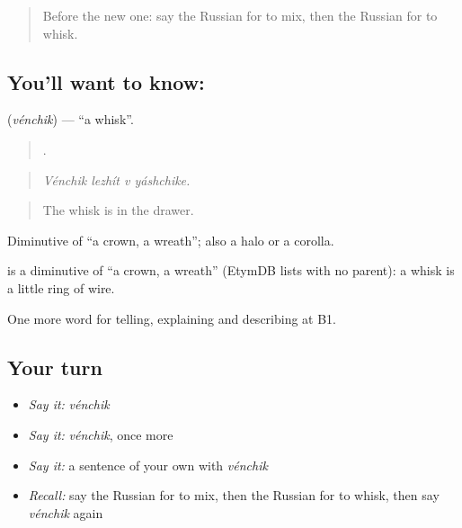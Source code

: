 \label{lesson:RU-C330-venchik}



\begin{quote}
Before the new one: say the Russian for to mix, then the Russian for to whisk.
\end{quote}

\subsection*{You'll want to know: }
\textbf{} (\emph{vénchik}) — \textquotedblleft{}a whisk\textquotedblright{}.

\begin{quote}
   .
\end{quote}

\begin{quote}
\emph{Vénchik lezhít v yáshchike.}
\end{quote}

\begin{quote}
The whisk is in the drawer.
\end{quote}

Diminutive of \emph{} \textquotedblleft{}a crown, a wreath\textquotedblright{}; also a halo or a corolla.

\begin{cousinweb}
\emph{} is a diminutive of \emph{} \textquotedblleft{}a crown, a wreath\textquotedblright{} (EtymDB lists \emph{} with no parent): a whisk is a little ring of wire.
\end{cousinweb}

\begin{grammarlens}[title={What you've built}]
One more word for telling, explaining and describing at B1.
\end{grammarlens}

\subsection*{Your turn}
\begin{itemize}
\raggedright
  \item \emph{Say it:} \emph{vénchik}
  \item \emph{Say it:} \emph{vénchik}, once more
  \item \emph{Say it:} a sentence of your own with \emph{vénchik}
  \item \emph{Recall:} say the Russian for to mix, then the Russian for to whisk, then say \emph{vénchik} again
\end{itemize}

